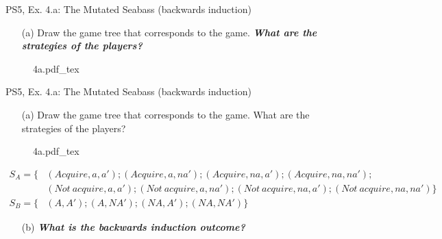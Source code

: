 \begin{frame}{PS5, Ex. 4.a: The Mutated Seabass (backwards induction)}
  \begin{itemize}
    \item[(a)] Draw the game tree that corresponds to the game. \textbf{\textit{What are the strategies of the players?}}
  \end{itemize}
  \vspace{-8pt}
  \begin{figure}[!h]
    \center
    \def\svgwidth{\columnwidth}
    {4a.pdf_tex}
  \end{figure}
  \vfill\null
\end{frame}
\begin{frame}{PS5, Ex. 4.a: The Mutated Seabass (backwards induction)}
  \begin{itemize}
    \item[(a)] Draw the game tree that corresponds to the game. What are the strategies of the players?
  \end{itemize}
  \vspace{-8pt}
  \begin{figure}[!h]
    \center
    \def\svgwidth{\columnwidth}
    {4a.pdf_tex}
  \end{figure}
  \vspace{-8pt}
  \begin{align*}
    S_A=\{ &(Acquire, a, a'); (Acquire, a, na'); (Acquire, na, a'); (Acquire, na, na');\\
            &(Not\ acquire, a, a'); (Not\ acquire, a, na'); (Not\ acquire, na, a'); (Not\ acquire, na, na') \}\\
    S_B=\{ &(A, A'); (A, NA'); (NA, A'); (NA, NA') \}
  \end{align*}
  \vspace{-12pt}
  \begin{itemize}
    \item[(b)] \textbf{\textit{What is the backwards induction outcome?}}
  \end{itemize}
  \vfill\null
\end{frame}


